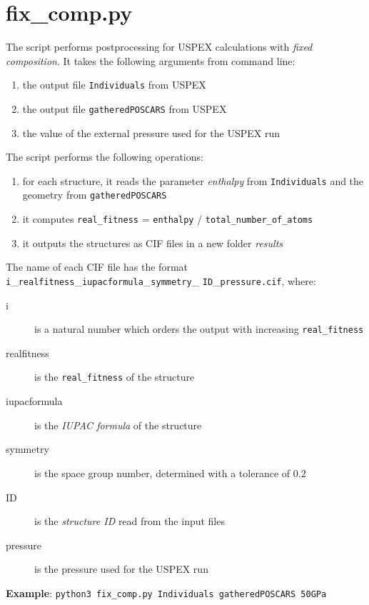 \documentclass{article}
\begin{document}
\section{fix\_comp.py}
The script performs postprocessing for USPEX calculations with \emph {fixed composition}. It takes the following arguments from command line:
\begin{enumerate}
	\item the output file \texttt{Individuals} from USPEX
	\item the output file \texttt{gatheredPOSCARS} from USPEX
	\item the value of the external pressure used for the USPEX run
\end{enumerate}
The script performs the following operations:
\begin{enumerate}
	\item for each structure, it reads the parameter \emph{enthalpy} from \texttt{Individuals} and the geometry from \texttt{gatheredPOSCARS}
	\item it computes \texttt{real\_fitness} = \texttt{enthalpy} / \texttt{total\_number\_of\_atoms}
	\item it outputs the structures as CIF files in a new folder \textit{results}
\end{enumerate}
The name of each CIF file has the format \texttt{i}\_\texttt{realfitness}\_\texttt{iupacformula}\_\texttt{symmetry}\_ \texttt{ID}\_\texttt{pressure.cif}, where:
\begin{description}
	\item[i] is a natural number which orders the output with increasing \texttt{real\_fitness}
	\item[realfitness] is the \texttt{real\_fitness} of the structure
	\item[iupacformula] is the \emph{IUPAC formula} of the structure
	\item[symmetry] is the space group number, determined with a tolerance of $0.2$
	\item[ID] is the \emph{structure ID} read from the input files
	\item[pressure] is the pressure used for the USPEX run
\end{description}
\textbf{Example}: \texttt{python3 fix\_comp.py Individuals gatheredPOSCARS 50GPa}

\vspace{1cm}
\end{document}
